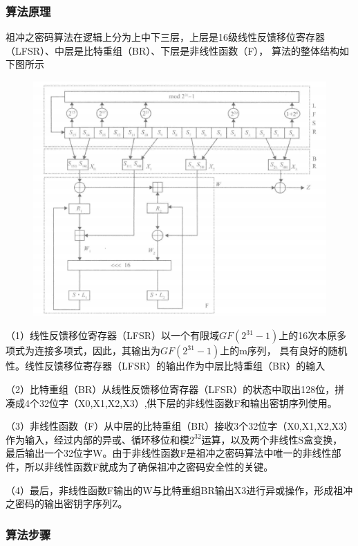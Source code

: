 \documentclass[a4paper,11pt,UTF8]{ctexart}
\newcommand{\bottomcaption}{%
\setlength{\abovecaptionskip}{6pt}%
\setlength{\belowcaptionskip}{6pt}%
\caption}
\newcommand{\xiaowuhao}{\fontsize{9pt}{\baselineskip}\selectfont}   %
\begin{document}
    \subsubsection{算法原理}
      祖冲之密码算法在逻辑上分为上中下三层，上层是16级线性反馈移位寄存器（LFSR）、中层是比特重组（BR）、下层是非线性函数（F），
      算法的整体结构如下图所示
      \begin{figure}[H]
        \centering
        \includegraphics[width=13cm]{ZUC算法结构.png}
        \bottomcaption{\xiaowuhao{祖冲之密码算法结构图}}
      \end{figure}
      （1）线性反馈移位寄存器（LFSR）以一个有限域$GF(2^{31}-1)$上的16次本原多项式为连接多项式，因此，其输出为$GF(2^{31}-1)$上的m序列，
      具有良好的随机性。线性反馈移位寄存器（LFSR）的输出作为中层比特重组（BR）的输入\par
      （2）比特重组（BR）从线性反馈移位寄存器（LFSR）的状态中取出128位，拼凑成4个32位字（X0,X1,X2,X3）,供下层的非线性函数F和输出密钥序列使用。\par
      （3）非线性函数（F）从中层的比特重组（BR）接收3个32位字（X0,X1,X2,X3）作为输入，经过内部的异或、循环移位和模$2^{32}$运算，以及两个非线性S盒变换，
      最后输出一个32位字W。由于非线性函数F是祖冲之密码算法中唯一的非线性部件，所以非线性函数F就成为了确保祖冲之密码安全性的关键。\par
      （4）最后，非线性函数F输出的W与比特重组BR输出X3进行异或操作，形成祖冲之密码的输出密钥字序列Z。

    \subsubsection{算法步骤}
\end{document}
